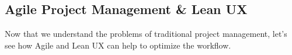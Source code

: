 \subsection{Agile Project Management \& Lean UX}
Now that we understand the problems of traditional project management, let's see how Agile and Lean
UX can help to optimize the workflow.